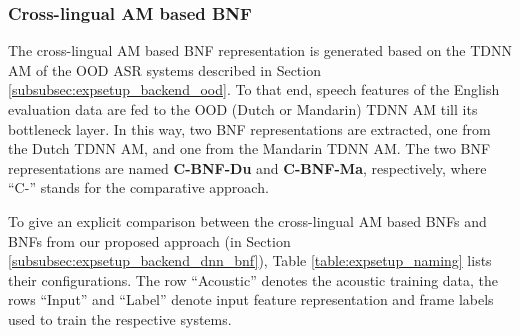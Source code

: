 \documentclass[transmag]{IEEEtran}
\begin{document}
\subsubsection{Cross-lingual AM based BNF}
The cross-lingual AM based BNF representation is generated based on the TDNN AM of the OOD ASR systems described in Section \ref{subsubsec:expsetup_backend_ood}.   To that end, speech features of the English evaluation data are fed to the OOD (Dutch or Mandarin) TDNN AM till its bottleneck layer. In this way, two BNF representations are extracted, one from the Dutch TDNN AM, and one from the Mandarin TDNN AM.  The two BNF representations are named \textbf{C-BNF-Du} and \textbf{C-BNF-Ma}, respectively, where ``C-'' 
stands for the  comparative approach. 

To give an explicit comparison between the cross-lingual AM based BNFs and  BNFs from our proposed approach (in Section \ref{subsubsec:expsetup_backend_dnn_bnf}), Table \ref{table:expsetup_naming} lists their configurations.
The row ``Acoustic'' denotes the acoustic training data, the rows ``Input'' and ``Label'' denote input feature representation and frame labels used to train the respective systems. %

\end{document}
